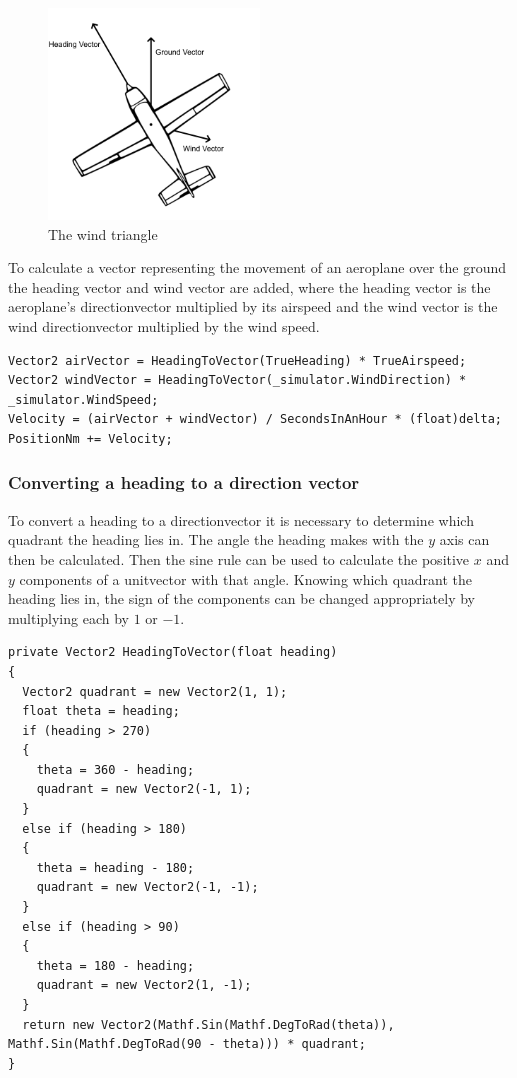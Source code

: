 \documentclass{article}
\begin{document}
\begin{figure}[H]
\centering
\includegraphics[width=0.5\textwidth]{diagrams/windtriangle.png}
\caption{\label{fig:windtriangle}The wind triangle}
\end{figure}
To calculate a \gls{vector} representing the movement of an aeroplane over the ground the heading \gls{vector} and wind \gls{vector} are added, where the \gls{heading} \gls{vector} is the aeroplane's \gls{directionvector} multiplied by its \gls{airspeed} and the wind \gls{vector} is the wind \gls{directionvector} multiplied by the wind speed.
\lstset{style=csharp}
\begin{lstlisting}[caption=Extract of the aeroplane physics process]
Vector2 airVector = HeadingToVector(TrueHeading) * TrueAirspeed;
Vector2 windVector = HeadingToVector(_simulator.WindDirection) * _simulator.WindSpeed;
Velocity = (airVector + windVector) / SecondsInAnHour * (float)delta;
PositionNm += Velocity;
\end{lstlisting}

\subsubsection{Converting a heading to a direction vector}
To convert a \gls{heading} to a \gls{directionvector} it is necessary to determine which \gls{quadrant} the \gls{heading} lies in.
The angle the \gls{heading} makes with the $y$ axis can then be calculated.
Then the sine rule can be used to calculate the positive $x$ and $y$ components of a \gls{unitvector} with that angle.
Knowing which \gls{quadrant} the \gls{heading} lies in, the sign of the components can be changed appropriately by multiplying each by $1$ or $-1$.
\lstset{style=csharp}
\begin{lstlisting}[caption=Converting a heading to a vector]
private Vector2 HeadingToVector(float heading)
{
  Vector2 quadrant = new Vector2(1, 1);
  float theta = heading;
  if (heading > 270)
  {
    theta = 360 - heading;
    quadrant = new Vector2(-1, 1);
  }
  else if (heading > 180)
  {
    theta = heading - 180;
    quadrant = new Vector2(-1, -1);
  }
  else if (heading > 90)
  {
    theta = 180 - heading;
    quadrant = new Vector2(1, -1);
  }
  return new Vector2(Mathf.Sin(Mathf.DegToRad(theta)), Mathf.Sin(Mathf.DegToRad(90 - theta))) * quadrant;
}
\end{lstlisting}
\end{document}
